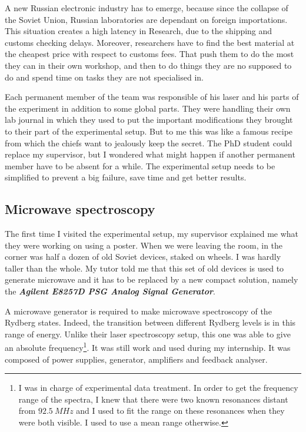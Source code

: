 \documentclass[twoside, open=right
]{scrreprt}
\begin{document}
\par A new Russian electronic industry has to emerge, because since the collapse of the Soviet Union, Russian laboratories are dependant on foreign importations. This situation creates a high latency in Research, due to the shipping and customs checking delays. Moreover, researchers have to find the best material at the cheapest price with respect to customs fees. That push them to do the most they can in their own workshop, and then to do things they are no supposed to do and spend time on tasks they are not specialised in.

\par Each permanent member of the team was responsible of his laser and his parts of the experiment in addition to some global parts. They were handling their own lab journal in which they used to put the important modifications they brought to their part of the experimental setup. But to me this was like a famous recipe from which the chiefs want to jealously keep the secret. The PhD student could replace my supervisor, but I wondered what might happen if another permanent member have to be absent for a while. The experimental setup needs to be simplified to prevent a big failure, save time and get better results.

\subsection{Microwave spectroscopy}

\par The first time I visited the experimental setup, my supervisor explained me what they were working on using a poster. When we were leaving the room, in the corner was half a dozen of old Soviet devices, staked on wheels. I was hardly taller than the whole. My tutor told me that this set of old devices is used to generate microwave and it has to be replaced by a new compact solution, namely the \emph{\textbf{Agilent E8257D PSG Analog Signal Generator}}.

\par A microwave generator is required to make microwave spectroscopy of the Rydberg states. Indeed, the transition between different Rydberg levels is in this range of energy. Unlike their laser spectroscopy setup, this one was able to give an absolute frequency\footnote{I was in charge of experimental data treatment. In order to get the frequency range of the spectra, I knew that there were two known resonances distant from $\SI{92.5}{MHz}$ and I used to fit the range on these resonances when they were both visible. I used to use a mean range otherwise.}. It was still work and used during my internship. It was composed of power supplies, generator, amplifiers and feedback analyser.
\end{document}

